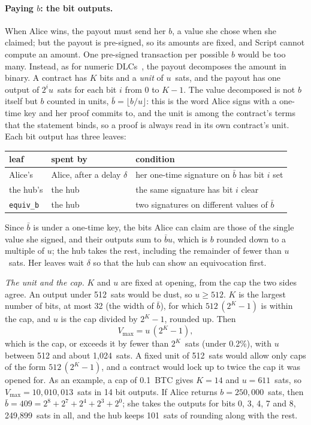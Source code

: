 \documentclass[11pt]{article}
\newcommand{\vmax}{V_{\max}}
\newcommand{\tx}[1]{\texttt{#1}}
\begin{document}
\paragraph{Paying $b$: the bit outputs.} When Alice wins, the payout
must send her $b$, a value she chose when she claimed; but the
payout is pre-signed, so its amounts are fixed, and Script cannot
compute an amount. One pre-signed transaction per possible $b$ would be
too many. Instead, as for numeric DLCs~\cite{dlcnumeric}, the payout
decomposes the amount in binary. A contract has $K$ bits and a
\emph{unit} of $u$~sats, and the payout has one output of $2^i u$~sats
for each bit $i$ from $0$ to $K - 1$. The value decomposed is not $b$
itself but $b$ counted in units, $\bar b = \lfloor b/u \rfloor$: this
is the word Alice signs with a one-time key and her proof commits to,
and the unit is among the contract's terms that the statement binds, so
a proof is always read in its own contract's unit. Each bit output has
three leaves:
\begin{center}
\small
\begin{tabular}{lll}
\toprule
leaf & spent by & condition \\
\midrule
Alice's & Alice, after a delay $\delta$ & her one-time signature on $\bar b$ has bit $i$ set \\
the hub's & the hub & the same signature has bit $i$ clear \\
\tx{equiv\_b} & the hub & two signatures on different values of $\bar b$ \\
\bottomrule
\end{tabular}
\end{center}
Since $\bar b$ is under a one-time key, the bits Alice can claim are
those of the single value she signed, and their outputs sum to
$\bar b u$, which is $b$ rounded down to a multiple of $u$; the hub takes
the rest, including the remainder of fewer than $u$~sats. Her leaves
wait $\delta$ so that the hub can show an equivocation first.

\emph{The unit and the cap.} $K$ and $u$ are fixed at opening, from the
cap the two sides agree. An output under 512~sats would be dust, so
$u \ge 512$. $K$ is the largest number of bits, at most 32 (the width of
$\bar b$), for which $512\,(2^K - 1)$ is within the cap, and $u$ is the
cap divided by $2^K - 1$, rounded up. Then
\[
\vmax = u\,(2^K - 1),
\]
which is the cap, or exceeds it by fewer than $2^K$~sats (under 0.2\%),
with $u$ between 512 and about 1{,}024~sats. A fixed unit of 512~sats
would allow only caps of the form $512\,(2^K - 1)$, and a contract would
lock up to twice the cap it was opened for. As an example, a cap of
0.1~BTC gives $K = 14$ and $u = 611$~sats, so $\vmax =
10{,}010{,}013$~sats in 14 bit outputs. If Alice returns $b =
250{,}000$~sats, then $\bar b = 409 = 2^8 + 2^7 + 2^4 + 2^3 + 2^0$; she
takes the outputs for bits 0, 3, 4, 7 and 8, 249{,}899~sats in all, and
the hub keeps 101~sats of rounding along with the rest.
\end{document}
